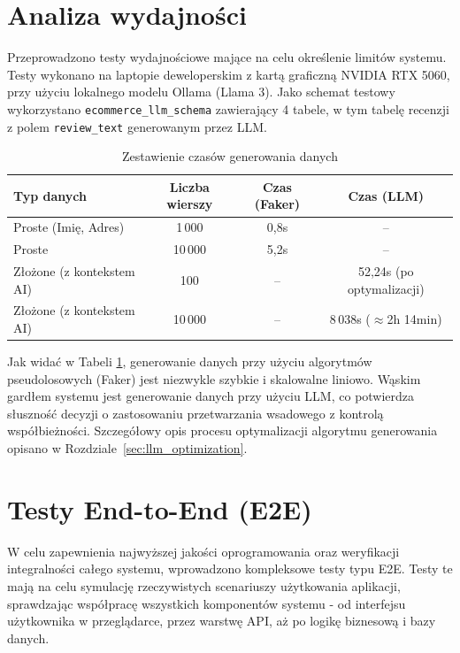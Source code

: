 \section{Analiza wydajności}
Przeprowadzono testy wydajnościowe mające na celu określenie limitów systemu. Testy wykonano na laptopie deweloperskim z kartą graficzną NVIDIA RTX 5060, przy użyciu lokalnego modelu Ollama (Llama 3). Jako schemat testowy wykorzystano \texttt{ecommerce\_llm\_schema} zawierający 4 tabele, w tym tabelę recenzji z polem \texttt{review\_text} generowanym przez \gls{LLM}.

\begin{table}[H]
    \centering
    \begin{tabular}{|l|c|c|c|}
        \hline
        \textbf{Typ danych}       & \textbf{Liczba wierszy} & \textbf{Czas (Faker)} & \textbf{Czas (\gls{LLM})}   \\
        \hline
        Proste (Imię, Adres)      & 1\,000                  & 0,8s                  & --                          \\
        \hline
        Proste                    & 10\,000                 & 5,2s                  & --                          \\
        \hline
        Złożone (z kontekstem AI) & 100                     & --                    & 52,24s (po optymalizacji)   \\
        \hline
        Złożone (z kontekstem AI) & 10\,000                 & --                    & 8\,038s ($\approx$2h 14min) \\
        \hline
    \end{tabular}
    \caption{Zestawienie czasów generowania danych}
    \label{tab:performance_tests}
\end{table}

Jak widać w Tabeli \ref{tab:performance_tests}, generowanie danych przy użyciu algorytmów pseudolosowych (Faker) jest niezwykle szybkie i skalowalne liniowo. Wąskim gardłem systemu jest generowanie danych przy użyciu \gls{LLM}, co potwierdza słuszność decyzji o zastosowaniu przetwarzania wsadowego z kontrolą współbieżności. Szczegółowy opis procesu optymalizacji algorytmu generowania opisano w Rozdziale~\ref{sec:llm_optimization}.

\section{Testy End-to-End (\gls{E2E})}
W celu zapewnienia najwyższej jakości oprogramowania oraz weryfikacji integralności całego systemu, wprowadzono kompleksowe testy typu \gls{E2E}. Testy te mają na celu symulację rzeczywistych scenariuszy użytkowania aplikacji, sprawdzając współpracę wszystkich komponentów systemu - od interfejsu użytkownika w przeglądarce, przez warstwę \gls{API}, aż po logikę biznesową i bazy danych.

